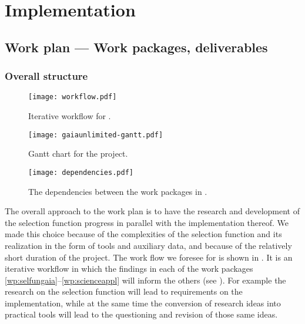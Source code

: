 \chapter{Implementation}
\label{cha:implementation}

\section{Work plan --- Work packages, deliverables}
\label{sec:work-plan}

\subsection{Overall structure}
\label{sec:wpstructure}

\begin{figure}
    \centering
    \texttt{[image: workflow.pdf]}
    \caption{Iterative workflow for {\acro}.}
    \label{fig:workflow}
\end{figure}

\begin{figure}
    \centering
    \texttt{[image: gaiaunlimited-gantt.pdf]}
    \caption{Gantt chart for the {\acro} project.}
    \label{fig:gantt}
\end{figure}

\begin{figure}
    \centering
    \texttt{[image: dependencies.pdf]}
    \caption{The dependencies between the work packages in \acro.}
    \label{fig:dependencies}
\end{figure}

The overall approach to the work plan is to have the research and development of the selection function progress in parallel with the implementation thereof. We made this choice because of the complexities of the selection function and its realization in the form of tools and auxiliary data, and because of the relatively short duration of the project. The work flow we foresee for {\acro} is shown in . It is an iterative workflow in which the findings in each of the work packages \ref{wp:selfungaia}--\ref{wp:scienceappl} will inform the others (see ). For example the research on the selection function will lead to requirements on the implementation, while at the same time the conversion of research ideas into practical tools will lead to the questioning and revision of those same ideas.

